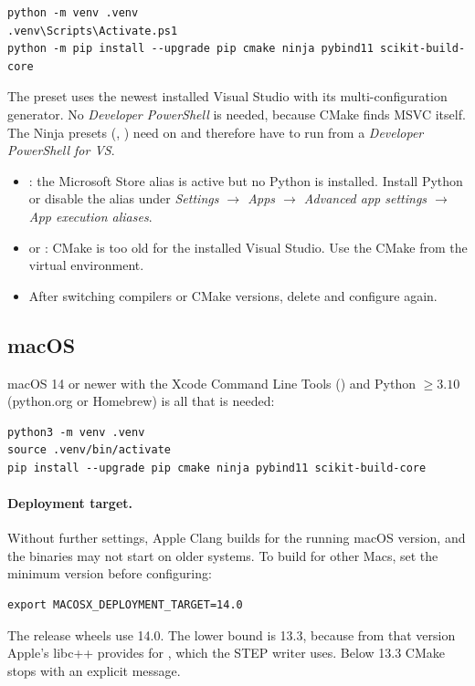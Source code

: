 \begin{lstlisting}[style=shell]
python -m venv .venv
.venv\Scripts\Activate.ps1
python -m pip install --upgrade pip cmake ninja pybind11 scikit-build-core
\end{lstlisting}

The  preset uses the newest installed Visual Studio with its multi-configuration
generator. No \emph{Developer PowerShell} is needed, because CMake finds MSVC itself. The Ninja
presets (, ) need  on  and therefore have to run
from a \emph{Developer PowerShell for VS}.

\begin{warning}
\begin{itemize}
  \item {}: the Microsoft Store alias is active but no Python is
    installed. Install Python or disable the alias under \emph{Settings $\to$ Apps $\to$ Advanced
    app settings $\to$ App execution aliases}.
  \item {} or : CMake is too
    old for the installed Visual Studio. Use the CMake from the virtual environment.
  \item After switching compilers or CMake versions, delete  and configure
    again.
\end{itemize}
\end{warning}

\subsection{macOS}\label{sec:install-macos}
macOS 14 or newer with the Xcode Command Line Tools () and Python
$\ge 3.10$ (python.org or Homebrew) is all that is needed:

\begin{lstlisting}[style=shell]
python3 -m venv .venv
source .venv/bin/activate
pip install --upgrade pip cmake ninja pybind11 scikit-build-core
\end{lstlisting}

\paragraph{Deployment target.} Without further settings, Apple Clang builds for the running
macOS version, and the binaries may not start on older systems. To build for other Macs, set
the minimum version before configuring:
\begin{lstlisting}[style=shell]
export MACOSX_DEPLOYMENT_TARGET=14.0
\end{lstlisting}
The release wheels use 14.0. The lower bound is 13.3, because from that version Apple's libc++
provides  for , which the STEP writer uses. Below 13.3 CMake
stops with an explicit message.

